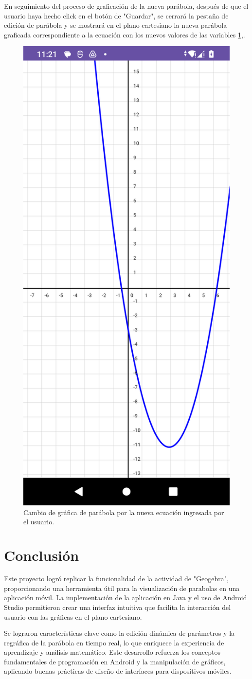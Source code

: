 \documentclass[conference]{IEEEtran}
\begin{document}
En seguimiento del proceso de graficación de la nueva parábola, después de que el usuario haya hecho click en el botón de "Guardar", se cerrará la pestaña de edición de parábola y se mostrará en el plano cartesiano la nueva parábola graficada correspondiente a la ecuación con los nuevos valores de las variables \ref{fig5},.
\begin{figure}[H]
    \centering
    \includegraphics[width=0.4\columnwidth]{nueva_parabola.png}
    \caption{Cambio de gráfica de parábola por la nueva ecuación ingresada por el usuario.}
    \label{fig5}
\end{figure}



\section{Conclusión}

Este proyecto logró replicar la funcionalidad de la actividad de "Geogebra", proporcionando una herramienta útil para la visualización de parabolas en una aplicación móvil. La implementación de la aplicación en Java y el uso de Android Studio permitieron crear una interfaz intuitiva que facilita la interacción del usuario con las gráficas en el plano cartesiano.

Se lograron características clave como la edición dinámica de parámetros y la regráfica de la parábola en tiempo real, lo que enriquece la experiencia de aprendizaje y análisis matemático. Este desarrollo refuerza los conceptos fundamentales de programación en Android y la manipulación de gráficos, aplicando buenas prácticas de diseño de interfaces para dispositivos móviles.

\printbibliography
\end{document}
